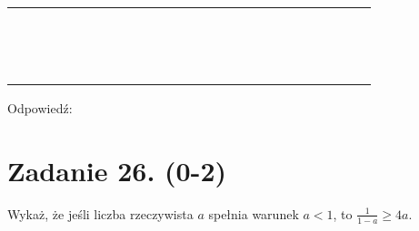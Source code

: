 \documentclass[10pt]{article}
\begin{document}
\begin{center}
\begin{tabular}{|c|c|c|c|c|c|c|c|c|c|c|c|c|c|c|c|c|c|c|c|c|c|c|c|c|}
\hline
 &  &  &  &  &  &  &  &  &  &  &  &  &  &  &  &  &  &  &  &  &  &  &  &  \\
\hline
 &  &  &  &  &  &  &  &  &  &  &  &  &  &  &  &  &  &  &  &  &  &  &  &  \\
\hline
 &  &  &  &  &  &  &  &  &  &  &  &  &  &  &  &  &  &  &  &  &  &  &  &  \\
\hline
 &  &  &  &  &  &  &  &  &  &  &  &  &  &  &  &  &  &  &  &  &  &  &  &  \\
\hline
 &  &  &  &  &  &  &  &  &  &  &  &  &  &  &  &  &  &  &  &  &  &  &  &  \\
\hline
 &  &  &  &  &  &  &  &  &  &  &  &  &  &  &  &  &  &  &  &  &  &  &  &  \\
\hline
 &  &  &  &  &  &  &  &  &  &  &  &  &  &  &  &  &  &  &  &  &  &  &  &  \\
\hline
 &  &  &  &  &  &  &  &  &  &  &  &  &  &  &  &  &  &  &  &  &  &  &  &  \\
\hline
 &  &  &  &  &  &  &  &  &  &  &  &  &  &  &  &  &  &  &  &  &  &  &  &  \\
\hline
 &  &  &  &  &  &  &  &  &  &  &  &  &  &  &  &  &  &  &  &  &  &  &  &  \\
\hline
 &  &  &  &  &  &  &  &  &  &  &  &  &  &  &  &  &  &  &  &  &  &  &  &  \\
\hline
 &  &  &  &  &  &  &  &  &  &  &  &  &  &  &  &  &  &  &  &  &  &  &  &  \\
\hline
 &  &  &  &  &  &  &  &  &  &  &  &  &  &  &  &  &  &  &  &  &  &  &  &  \\
\hline
 &  &  &  &  &  &  &  &  &  &  &  &  &  &  &  &  &  &  &  &  &  &  &  &  \\
\hline
 &  &  &  &  &  &  &  &  &  &  &  &  &  &  &  &  &  &  &  &  &  &  &  &  \\
\hline
\end{tabular}
\end{center}

Odpowiedź:

\section*{Zadanie 26. (0-2)}
Wykaż, że jeśli liczba rzeczywista \(a\) spełnia warunek \(a<1\), to \(\frac{1}{1-a} \geq 4 a\).
\end{document}

